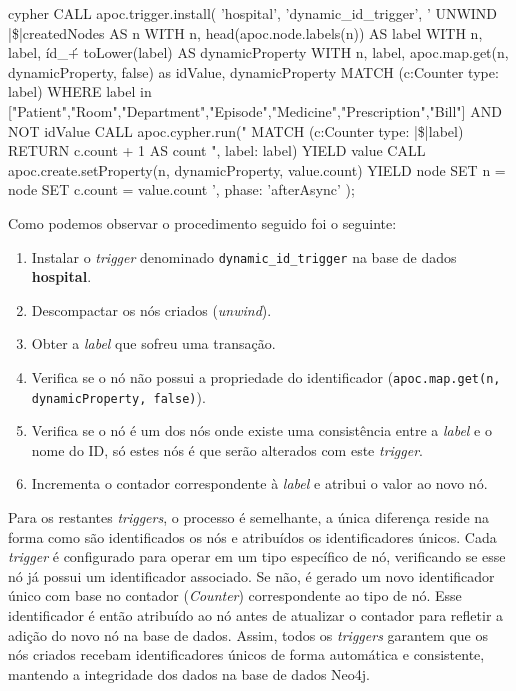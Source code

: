 \begin{myminted}{cypher}
CALL apoc.trigger.install(
    'hospital',
    'dynamic_id_trigger',
    '
    UNWIND |\$|createdNodes AS n
    WITH n, head(apoc.node.labels(n)) AS label
    WITH n, label, \'id_\' + toLower(label) AS dynamicProperty
    WITH n, label, apoc.map.get(n, dynamicProperty, false) as idValue, dynamicProperty
    MATCH (c:Counter {type: label})
    WHERE label in ["Patient","Room","Department","Episode","Medicine","Prescription","Bill"] AND NOT idValue 
    CALL apoc.cypher.run("
        MATCH (c:Counter {type: |\$|label})
        RETURN c.count + 1 AS count
    ", {label: label}) YIELD value
    CALL apoc.create.setProperty(n, dynamicProperty, value.count) YIELD node
    SET n = node
    SET c.count = value.count
    ',
    {phase: 'afterAsync'}
);
\end{myminted}

Como podemos observar o procedimento seguido foi o seguinte:
\begin{enumerate}
    \item Instalar o \textit{trigger} denominado \texttt{dynamic\_id\_trigger} na base de dados \textbf{hospital}.
    \item Descompactar os nós criados (\textit{unwind}).
    \item Obter a \textit{label} que sofreu uma transação.
    \item Verifica se o nó não possui a propriedade do identificador (\texttt{apoc.map.get(n, dynamicProperty, false)}).
    \item Verifica se o nó é um dos nós onde existe uma consistência entre a \textit{label} e o nome do ID, só estes nós é que serão alterados com este \textit{trigger}.
    \item Incrementa o contador correspondente à \textit{label} e atribui o valor ao novo nó.
\end{enumerate}

Para os restantes \textit{triggers}, o processo é semelhante, a única diferença reside na forma como são identificados os nós e atribuídos os identificadores únicos. Cada \textit{trigger} é configurado para operar em um tipo específico de nó, verificando se esse nó já possui um identificador associado. Se não, é gerado um novo identificador único com base no contador (\textit{Counter}) correspondente ao tipo de nó. Esse identificador é então atribuído ao nó antes de atualizar o contador para refletir a adição do novo nó na base de dados. Assim, todos os \textit{triggers} garantem que os nós criados recebam identificadores únicos de forma automática e consistente, mantendo a integridade dos dados na base de dados Neo4j.

